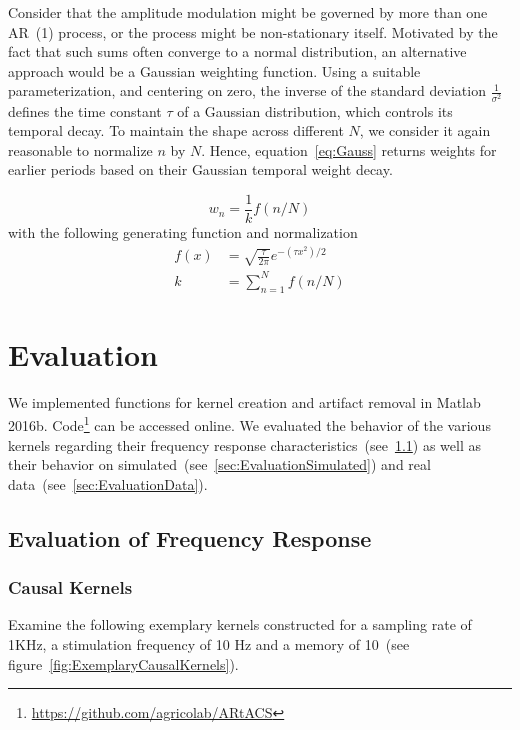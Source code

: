 \documentclass[a4paper]{article}
\newcommand{\figref}[1]{(see figure~\ref{#1})}
\begin{document}
Consider that the amplitude modulation might be governed by more than one AR~(1) process, or the process might be non-stationary itself.
Motivated by the fact that such sums  often converge to a normal distribution, an alternative approach would be a Gaussian weighting function.
Using a suitable parameterization, and centering on zero, the inverse of the standard deviation $\frac{1}{\sigma^2}$ defines the time constant $\tau$ of a Gaussian distribution, which controls its temporal decay.
To maintain the shape across different $N$, we consider it again reasonable to normalize $n$ by $N$. Hence, equation~\eqref{eq:Gauss} returns weights for earlier periods based on their Gaussian temporal weight decay.

\begin{equation}
    w_n = \frac{1}{k} f(n/N)\label{eq:Gauss}
\end{equation}
with the following generating function and normalization
\begin{align}
    f(x)  & = \sqrt{\frac{\tau}{2\pi}} e^{-(\tau x^2)/2}  \\
    k  & = \sum_{n=1}^{N} f(n/N)\label{eq:NormGauss}
\end{align}


\section{Evaluation}

We implemented functions for kernel creation and artifact removal in Matlab 2016b. Code\footnote{\url{https://github.com/agricolab/ARtACS}}  can be accessed online. We evaluated the behavior of the various kernels regarding their frequency response characteristics~(see~\ref{sec:EvaluationFreq}) as well as their behavior on simulated~(see~\ref{sec:EvaluationSimulated})  and real data~(see~\ref{sec:EvaluationData}).

\subsection{Evaluation of Frequency Response}\label{sec:EvaluationFreq}

\subsubsection{Causal Kernels}

Examine the following exemplary kernels constructed for a sampling rate of 1KHz, a stimulation frequency of 10 Hz and a memory of 10~\figref{fig:ExemplaryCausalKernels}.
\end{document}
